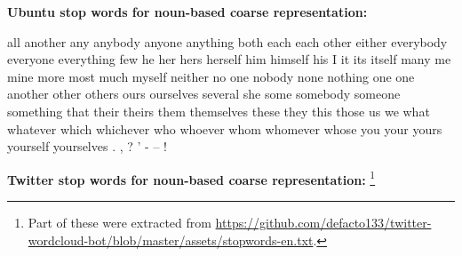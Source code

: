 \documentclass{article}
\begin{document}
\textbf{Ubuntu stop words for noun-based coarse representation:}
\begin{framed}
\scriptsize
all another any anybody anyone anything both each each other either everybody everyone everything few he her hers herself him himself his I it its itself many me mine more most much myself neither no one nobody none nothing one one another other others ours ourselves several she some somebody someone something that their theirs them themselves these they this those us we what whatever which whichever who whoever whom whomever whose you your yours yourself yourselves . , ? ' - -- !
\end{framed}

\newpage

\textbf{Twitter stop words for noun-based coarse representation:} \footnote{Part of these were extracted from \url{https://github.com/defacto133/twitter-wordcloud-bot/blob/master/assets/stopwords-en.txt}.}
\end{document}

